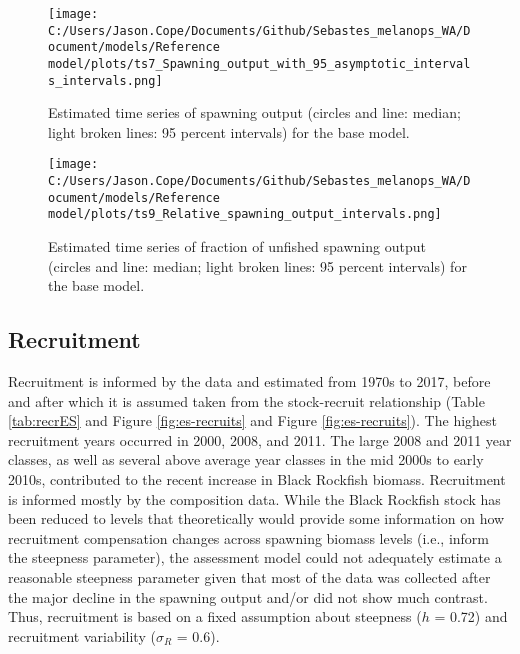 \documentclass[11pt,
  english,
  letterpaper,
]{article}
\begin{document}
\begin{figure}
\centering
\texttt{[image: C:/Users/Jason.Cope/Documents/Github/Sebastes\_melanops\_WA/Document/models/Reference model/plots/ts7\_Spawning\_output\_with\_95\_asymptotic\_intervals\_intervals.png]}
\caption{Estimated time series of spawning output (circles and line: median; light broken lines: 95 percent intervals) for the base model.\label{fig:es-ssb}}
\end{figure}

\begin{figure}
\centering
\texttt{[image: C:/Users/Jason.Cope/Documents/Github/Sebastes\_melanops\_WA/Document/models/Reference model/plots/ts9\_Relative\_spawning\_output\_intervals.png]}
\caption{Estimated time series of fraction of unfished spawning output (circles and line: median; light broken lines: 95 percent intervals) for the base model.\label{fig:es-depl}}
\end{figure}

\clearpage

\hypertarget{recruitment}{%
\subsection*{Recruitment}\label{recruitment}}

Recruitment is informed by the data and estimated from 1970s to 2017, before and after which it is assumed taken from the stock-recruit relationship (Table \ref{tab:recrES} and Figure \ref{fig:es-recruits} and Figure \ref{fig:es-recruits}). The highest recruitment years occurred in 2000, 2008, and 2011. The large 2008 and 2011 year classes, as well as several above average year classes in the mid 2000s to early 2010s, contributed to the recent increase in Black Rockfish biomass. Recruitment is informed mostly by the composition data. While the Black Rockfish stock has been reduced to levels that theoretically would provide some information on how recruitment compensation changes across spawning biomass levels (i.e., inform the steepness parameter), the assessment model could not adequately estimate a reasonable steepness parameter given that most of the data was collected after the major decline in the spawning output and/or did not show much contrast. Thus, recruitment is based on a fixed assumption about steepness (\(h\) = 0.72) and recruitment variability (\(\sigma_R\) = 0.6).


\end{document}
